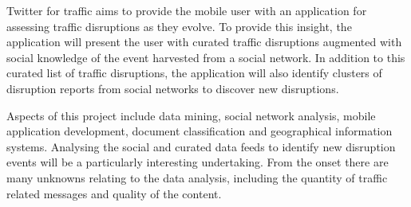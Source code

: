 Twitter for traffic aims to provide the mobile user with an application for
assessing traffic disruptions as they evolve. To provide this insight, the
application will present the user with curated traffic disruptions augmented
with social knowledge of the event harvested from a social network. In addition
to this curated list of traffic disruptions, the application will also identify
clusters of disruption reports from social networks to discover new disruptions.

Aspects of this project include data mining, social network analysis, mobile
application development, document classification and geographical information
systems. Analysing the social and curated data feeds to identify new disruption
events will be a particularly interesting undertaking. From the onset there are
many unknowns relating to the data analysis, including the quantity of traffic related messages and quality of the content. 
